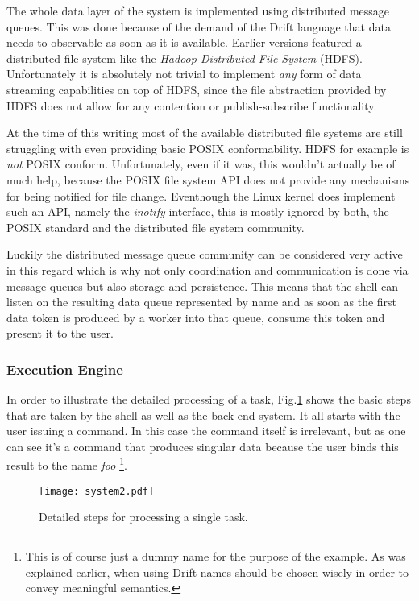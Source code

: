The whole data layer of the system is implemented using distributed
message queues. This was done because of the demand of the Drift
language that data needs to observable as soon as it is available.
Earlier versions featured a distributed file system like the
\textit{Hadoop Distributed File System} (HDFS). Unfortunately it
is absolutely not trivial to implement \textit{any} form of
data streaming capabilities on top of HDFS, since the file
abstraction provided by HDFS does not allow for any contention
or publish-subscribe functionality.

At the time of this writing most of the available distributed
file systems are still struggling with even providing basic
POSIX conformability. HDFS for example is \textit{not} POSIX
conform. Unfortunately, even if it was, this wouldn't actually be of
much help, because the POSIX file system API does not provide
any mechanisms for being notified for file change. Eventhough
the Linux kernel does implement such an API, namely the
\textit{inotify} interface, this is mostly ignored by both,
the POSIX standard and the distributed file system community.

Luckily the distributed message queue community can be considered
very active in this regard which is why not only coordination
and communication is done via message queues but also storage
and persistence. This means that the shell can listen on the
resulting data queue represented by name and as soon as the first
data token is produced by a worker into that queue, consume this
token and present it to the user.

\subsubsection{Execution Engine}
\label{distributedexecution}

In order to illustrate the detailed processing of a task,
Fig.\ref{system2} shows the basic steps that are taken by the
shell as well as the back-end system.
It all starts with the user issuing a command. In this case
the command itself is irrelevant, but as one can see it's a
command that produces singular data because the user binds
this result to the name \textit{foo} \footnote{This is of
course just a dummy name for the purpose of the example. As was
explained earlier, when using Drift names should be chosen wisely
in order to convey meaningful semantics.}.

\begin{figure}[h]
  \texttt{[image: system2.pdf]}
  \caption{Detailed steps for processing a single task.}
  \label{system2}
\end{figure}

